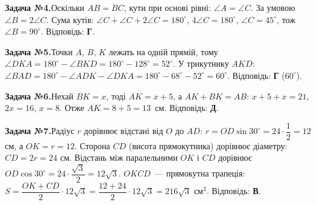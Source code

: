 \documentclass[12pt]{article}
\begin{document}
\begin{tcolorbox}[colback=titleBg!40, colframe=mainGreen!55, boxrule=0.4pt, arc=2pt, left=6pt, right=6pt, top=4pt, bottom=4pt, breakable]
\noindent\small\textbf{Задача №4.}\quad Оскільки $AB=BC$, кути при основі рівні: $\angle A=\angle C$. За умовою $\angle B=2\angle C$. Сума кутів: $\angle C+\angle C+2\angle C=180^\circ$, $4\angle C=180^\circ$, $\angle C=45^\circ$, тож $\angle B=90^\circ$. Відповідь: \textbf{Г}.
\par\vspace{0.1cm}\hfill\hyperlink{task:4}{}
\end{tcolorbox}
\par\vspace{0.3cm}\noindent\hypertarget{sol:5}{}
\begin{tcolorbox}[colback=titleBg!40, colframe=mainGreen!55, boxrule=0.4pt, arc=2pt, left=6pt, right=6pt, top=4pt, bottom=4pt, breakable]
\noindent\small\textbf{Задача №5.}\quad Точки $A$, $B$, $K$ лежать на одній прямій, тому $\angle DKA = 180^\circ - \angle BKD = 180^\circ - 128^\circ = 52^\circ$. У трикутнику $AKD$: $\angle BAD = 180^\circ - \angle ADK - \angle DKA = 180^\circ - 68^\circ - 52^\circ = 60^\circ$. Відповідь: \textbf{Г} ($60^\circ$).
\par\vspace{0.1cm}\hfill\hyperlink{task:5}{}
\end{tcolorbox}
\par\vspace{0.3cm}\noindent\hypertarget{sol:6}{}
\begin{tcolorbox}[colback=titleBg!40, colframe=mainGreen!55, boxrule=0.4pt, arc=2pt, left=6pt, right=6pt, top=4pt, bottom=4pt, breakable]
\noindent\small\textbf{Задача №6.}\quad Нехай $BK=x$, тоді $AK=x+5$, а $AK+BK=AB$: $x+5+x=21$, $2x=16$, $x=8$. Отже $AK=8+5=13$~см. Відповідь: \textbf{Д}.
\par\vspace{0.1cm}\hfill\hyperlink{task:6}{}
\end{tcolorbox}
\par\vspace{0.3cm}\noindent\hypertarget{sol:7}{}
\begin{tcolorbox}[colback=titleBg!40, colframe=mainGreen!55, boxrule=0.4pt, arc=2pt, left=6pt, right=6pt, top=4pt, bottom=4pt, breakable]
\noindent\small\textbf{Задача №7.}\quad Радіус $r$ дорівнює відстані від $O$ до $AD$: $r = OD\sin30^\circ = 24\cdot\dfrac12 = 12$ см, а $OK = r = 12$. Сторона $CD$ (висота прямокутника) дорівнює діаметру: $CD = 2r = 24$ см. Відстань між паралельними $OK$ і $CD$ дорівнює $OD\cos30^\circ = 24\cdot\dfrac{\sqrt3}{2} = 12\sqrt3$. $OKCD$~--- прямокутна трапеція: $S = \dfrac{OK + CD}{2}\cdot 12\sqrt3 = \dfrac{12+24}{2}\cdot 12\sqrt3 = 216\sqrt3$ см$^2$. Відповідь: \textbf{В}.
\par\vspace{0.1cm}\hfill\hyperlink{task:7}{}
\end{tcolorbox}
\end{document}
